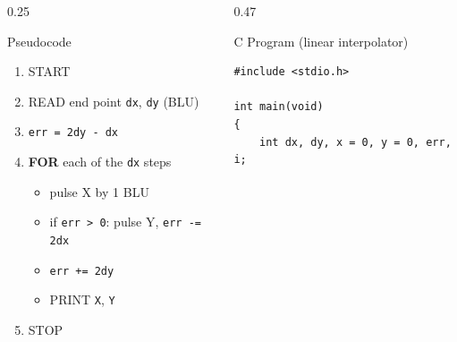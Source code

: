 \documentclass[aspectratio=169]{beamer}
\begin{document}
	\begin{frame}{}

		\vspace*{0.05cm}

		\begin{columns}[T,onlytextwidth]


			\begin{column}{0.25\textwidth}

				\begin{block}{Pseudocode}
					\scriptsize
					\begin{enumerate}
						\item START
						\item READ end point \texttt{dx}, \texttt{dy} (BLU)
						\item \texttt{err = 2dy - dx}
						\item \textbf{FOR} each of the \texttt{dx} steps
						\begin{itemize}\scriptsize
							\item pulse X by 1 BLU
							\item if \texttt{err > 0}: pulse Y, \texttt{err -= 2dx}
							\item \texttt{err += 2dy}
							\item PRINT \texttt{X}, \texttt{Y}
						\end{itemize}
						\item STOP
					\end{enumerate}
				\end{block}

			\end{column}


			\hspace*{0.3cm}
			\begin{column}{0.47\textwidth}

				\begin{block}{C Program (linear interpolator)}

\begin{lstlisting}[style=cstyle,numbers=none,basicstyle=\ttfamily\scriptsize]
#include <stdio.h>

int main(void)
{
	int dx, dy, x = 0, y = 0, err, i;


\end{lstlisting}
\end{block}
\end{column}
\end{columns}
\end{frame}
\end{document}
